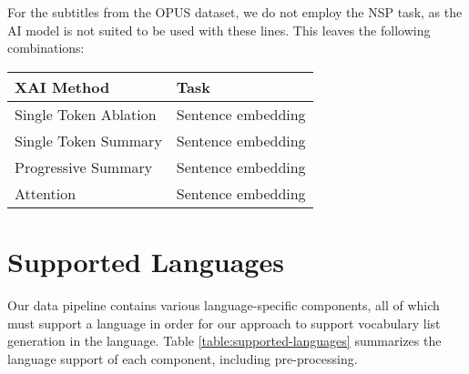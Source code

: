 For the subtitles from the OPUS dataset, we do not employ the NSP task, as the AI model is not suited to be used with these lines.
This leaves the following combinations:

\begin{table}[H]
	\centering
	\begin{tabularx}{\textwidth}{|X|X|}
		\hline
		\textbf{XAI Method}   & \textbf{Task}            \\
		\hline
		Single Token Ablation & Sentence embedding       \\
		\hline
		Single Token Summary  & Sentence embedding       \\
		\hline
		Progressive Summary   & Sentence embedding       \\
		\hline
		Attention             & Sentence embedding       \\
		\hline
	\end{tabularx}
\end{table}



% 	

\section{Supported Languages}
Our data pipeline contains various language-specific components, all of which must support a language in order for our approach to support vocabulary list generation in the language.
Table \ref{table:supported-languages} summarizes the language support of each component, including pre-processing.

